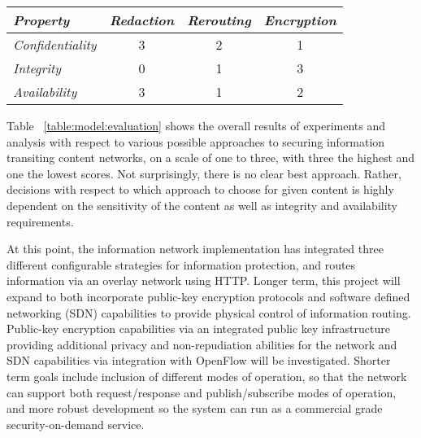 \begin{table*}[tp] %
\centering %
\begin{tabular}{lccc}
\toprule %
{\it Property}			& {\it Redaction}	& {\it Rerouting} 	& {\it Encryption} 	\\\toprule
{\it Confidentiality} 	& 3				  	& 2					& 1				 	\\\midrule
{\it Integrity}			& 0					& 1					& 3 					\\\midrule
{\it Availability}		& 3					& 1					& 2					\\\bottomrule
\end{tabular}
\caption{Approach Evaluation Summary}
\label{table:model:evaluation}
\end{table*}

Table ~\ref{table:model:evaluation} shows the overall results of experiments and analysis with respect to various possible approaches to securing information transiting content networks, on a scale of one to three, with three the highest and one the lowest scores.  Not surprisingly, there is no clear best approach.  Rather, decisions with respect to which approach to choose for given content is highly dependent on the sensitivity of the content as well as integrity and availability requirements.
	
At this point, the information network implementation has integrated three different configurable strategies for information protection, and routes information via an overlay network using HTTP.  Longer term, this project will expand to both incorporate public-key encryption protocols and software defined networking (SDN) capabilities to provide physical control of information routing.  Public-key encryption capabilities via an integrated public key infrastructure providing additional privacy and non-repudiation abilities for the network and SDN capabilities via integration with OpenFlow will be investigated.  Shorter term goals include inclusion of different modes of operation, so that the network can support both request/response and publish/subscribe modes of operation, and more robust development so the system can run as a commercial grade security-on-demand service.
